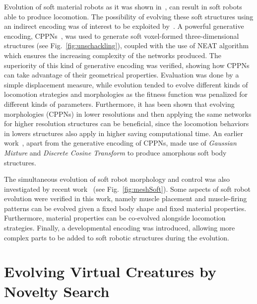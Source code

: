 Evolution of soft material robots as it was shown in~\citep{hiller2012automatic}, can result in soft robots able to produce locomotion. The possibility of evolving these soft structures using an indirect encoding was of interest to be exploited by~\citep{cheney2013unshackling}. A powerful generative encoding, CPPNs~\citep{stanley2007compositional}, was used to generate soft voxel-formed three-dimensional structures (see Fig.~\ref{fig:unschackling}), coupled with the use of NEAT algorithm which ensures the increasing complexity of the networks produced. The superiority of this kind of generative encoding was verified, showing how CPPNs can take advantage of their geometrical properties. Evaluation was done by a simple displacement measure, while evolution tended to evolve different kinds of locomotion strategies and morphologies as the fitness function was penalized for different kinds of parameters. Furthermore, it has been shown that evolving morphologies (CPPNs) in lower resolutions and then applying the same networks for higher resolution structures can be beneficial, since the locomotion behaviors in lowers structures also apply in higher saving computational time. An earlier work~\citep{hiller2010evolving}, apart from the generative encoding of CPPNs, made use of \textit{Gaussian Mixture} and \textit{Discrete Cosine Transform} to produce amorphous soft body structures.

The simultaneous evolution of soft robot morphology and control was also investigated by recent work~\citep{rieffel2014growing} (see Fig.~\ref{fig:meshSoft}). Some aspects of soft robot evolution were verified in this work, namely muscle placement and muscle-firing patterns can be evolved given a fixed body shape and fixed material properties. Furthermore, material properties can be co-evolved alongside locomotion strategies. Finally, a developmental encoding was introduced, allowing more complex parts to be added to soft robotic structures during the evolution.


\section{Evolving Virtual Creatures by Novelty Search}

